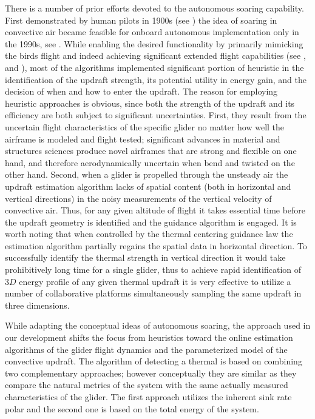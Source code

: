 \documentclass{ifacconf}
\begin{document}
There is a number of prior efforts devoted to the autonomous soaring capability. First demonstrated by human pilots in 1900s (see \cite{Simons:1998}) the idea of soaring in convective air became feasible for onboard autonomous implementation only in the 1990s, see \cite{Wharington:1998}. While enabling the desired functionality by primarily mimicking the birds flight and indeed achieving significant extended flight capabilities (see \cite{Edwards:2008}, \cite{Allen:2006} and \cite{Allen:2007}), most of the algorithms implemented significant portion of heuristic in the identification of the updraft strength, its potential utility in energy gain, and the decision of when and how to enter the updraft. The reason for employing heuristic approaches is obvious, since both the strength of the updraft and its efficiency are both subject to significant uncertainties. First, they result from the uncertain flight characteristics of the specific glider no matter how well the airframe is modeled and flight tested; significant advances in material and structures sciences produce novel airframes that are strong and flexible on one hand, and therefore aerodynamically uncertain when bend and twisted on the other hand. Second, when a glider is propelled through the unsteady air the updraft estimation algorithm lacks of spatial content (both in horizontal and vertical directions) in the noisy measurements of the vertical velocity of convective air. Thus, for any given altitude of flight it takes essential time before the updraft geometry is identified and the guidance algorithm is engaged. It is worth noting that when controlled by the thermal centering guidance law the estimation algorithm partially regains the spatial data in horizontal direction. To successfully identify the thermal strength in vertical direction it would take prohibitively long time for a single glider, thus to achieve rapid identification of $3D$ energy profile of any given thermal updraft it is very effective to utilize a number of collaborative platforms simultaneously sampling the same updraft in three dimensions.

While adapting the conceptual ideas of autonomous soaring, the approach used in our development shifts the focus from heuristics toward the online estimation algorithms of the glider flight dynamics and the parameterized model of the convective updraft. The algorithm of detecting a thermal is based on combining two complementary approaches; however conceptually they are similar as they compare the natural metrics of the system with the same actually measured characteristics of the glider. The first approach utilizes the inherent sink rate polar and the second one is based on the total energy of the system.
\end{document}
